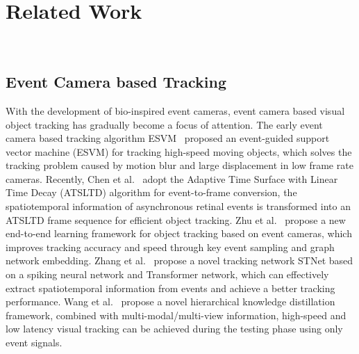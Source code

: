 \section{Related Work}
~\label{sec:Related Work} 




\subsection{Event Camera based Tracking}  \label{subsec:eventtracking}
With the development of bio-inspired event cameras, event camera based visual object tracking has gradually become a focus of attention. The early event camera based tracking algorithm ESVM~\cite{huang2018event} proposed an event-guided support vector machine (ESVM) for tracking high-speed moving objects, which solves the tracking problem caused by motion blur and large displacement in low frame rate cameras. Recently, Chen et al.~\cite{chen2019asynchronous} adopt the Adaptive Time Surface with Linear Time Decay (ATSLTD) algorithm for event-to-frame conversion, the spatiotemporal information of asynchronous retinal events is transformed into an ATSLTD frame sequence for efficient object tracking. Zhu et al.~\cite{zhu2022grapheventTrack} propose a new end-to-end learning framework for object tracking based on event cameras, which improves tracking accuracy and speed through key event sampling and graph network embedding. Zhang et al.~\cite{zhang2022STN} propose a novel tracking network STNet based on a spiking neural network and Transformer network, which can effectively extract spatiotemporal information from events and achieve a better tracking performance. Wang et al.~\cite{wang2024event} propose a novel hierarchical knowledge distillation framework, combined with multi-modal/multi-view information, high-speed and low latency visual tracking can be achieved during the testing phase using only event signals. 


